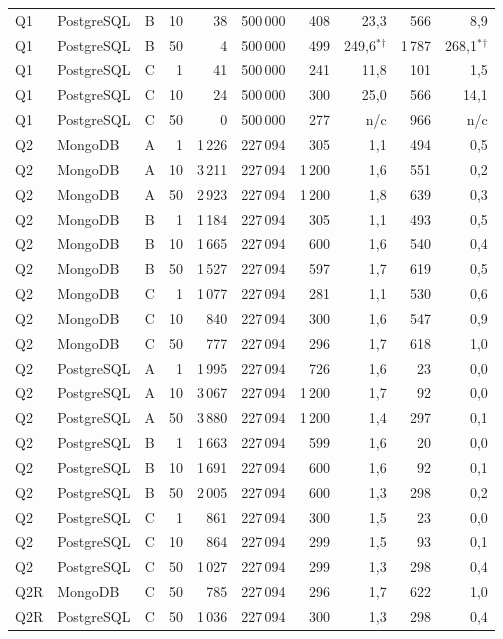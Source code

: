\begin{longtable}{llcrrrrrrr}
Q1 & PostgreSQL & B & 10 & 38 & 500\,000 & 408 & 23{,}3 & 566 & 8{,}9 \\
Q1 & PostgreSQL & B & 50 & 4 & 500\,000 & 499 & 249{,}6$^{*}$$^{\dagger}$ & 1\,787 & 268{,}1$^{*}$$^{\dagger}$ \\
Q1 & PostgreSQL & C & 1 & 41 & 500\,000 & 241 & 11{,}8 & 101 & 1{,}5 \\
Q1 & PostgreSQL & C & 10 & 24 & 500\,000 & 300 & 25{,}0 & 566 & 14{,}1 \\
Q1 & PostgreSQL & C & 50 & 0 & 500\,000 & 277 & n/c & 966 & n/c \\
\addlinespace
Q2 & MongoDB & A & 1 & 1\,226 & 227\,094 & 305 & 1{,}1 & 494 & 0{,}5 \\
Q2 & MongoDB & A & 10 & 3\,211 & 227\,094 & 1\,200 & 1{,}6 & 551 & 0{,}2 \\
Q2 & MongoDB & A & 50 & 2\,923 & 227\,094 & 1\,200 & 1{,}8 & 639 & 0{,}3 \\
Q2 & MongoDB & B & 1 & 1\,184 & 227\,094 & 305 & 1{,}1 & 493 & 0{,}5 \\
Q2 & MongoDB & B & 10 & 1\,665 & 227\,094 & 600 & 1{,}6 & 540 & 0{,}4 \\
Q2 & MongoDB & B & 50 & 1\,527 & 227\,094 & 597 & 1{,}7 & 619 & 0{,}5 \\
Q2 & MongoDB & C & 1 & 1\,077 & 227\,094 & 281 & 1{,}1 & 530 & 0{,}6 \\
Q2 & MongoDB & C & 10 & 840 & 227\,094 & 300 & 1{,}6 & 547 & 0{,}9 \\
Q2 & MongoDB & C & 50 & 777 & 227\,094 & 296 & 1{,}7 & 618 & 1{,}0 \\
\addlinespace
Q2 & PostgreSQL & A & 1 & 1\,995 & 227\,094 & 726 & 1{,}6 & 23 & 0{,}0 \\
Q2 & PostgreSQL & A & 10 & 3\,067 & 227\,094 & 1\,200 & 1{,}7 & 92 & 0{,}0 \\
Q2 & PostgreSQL & A & 50 & 3\,880 & 227\,094 & 1\,200 & 1{,}4 & 297 & 0{,}1 \\
Q2 & PostgreSQL & B & 1 & 1\,663 & 227\,094 & 599 & 1{,}6 & 20 & 0{,}0 \\
Q2 & PostgreSQL & B & 10 & 1\,691 & 227\,094 & 600 & 1{,}6 & 92 & 0{,}1 \\
Q2 & PostgreSQL & B & 50 & 2\,005 & 227\,094 & 600 & 1{,}3 & 298 & 0{,}2 \\
Q2 & PostgreSQL & C & 1 & 861 & 227\,094 & 300 & 1{,}5 & 23 & 0{,}0 \\
Q2 & PostgreSQL & C & 10 & 864 & 227\,094 & 299 & 1{,}5 & 93 & 0{,}1 \\
Q2 & PostgreSQL & C & 50 & 1\,027 & 227\,094 & 299 & 1{,}3 & 298 & 0{,}4 \\
\addlinespace
Q2R & MongoDB & C & 50 & 785 & 227\,094 & 296 & 1{,}7 & 622 & 1{,}0 \\
\addlinespace
Q2R & PostgreSQL & C & 50 & 1\,036 & 227\,094 & 300 & 1{,}3 & 298 & 0{,}4 \\
\end{longtable}
